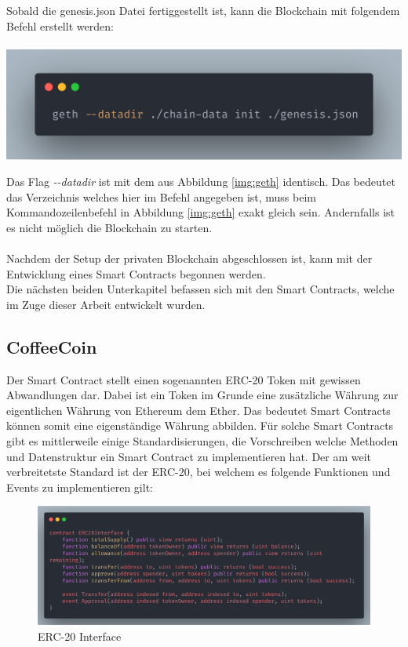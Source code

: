 Sobald die genesis.json Datei fertiggestellt ist, kann die Blockchain mit folgendem Befehl erstellt werden:\\\\
\includegraphics[width=.9\columnwidth]{./Abbildungen/Kapitel_03/geth-init.png}

Das Flag \textit{-{}-datadir} ist mit dem aus Abbildung \ref{img:geth} identisch. Das bedeutet das Verzeichnis welches hier im Befehl angegeben ist, muss beim Kommandozeilenbefehl in Abbildung \ref{img:geth} exakt gleich sein. Andernfalls ist es nicht möglich die Blockchain zu starten.\\\\
Nachdem der Setup der privaten Blockchain abgeschlossen ist, kann mit der Entwicklung eines Smart Contracts begonnen werden. \\
Die nächsten beiden Unterkapitel befassen sich mit den Smart Contracts, welche im Zuge dieser Arbeit entwickelt wurden.

\subsection{CoffeeCoin}
\label{subsec:cc}
Der Smart Contract  stellt einen sogenannten ERC-20 Token mit gewissen Abwandlungen dar. Dabei ist ein Token im Grunde eine zusätzliche Währung zur eigentlichen Währung von Ethereum dem Ether. Das bedeutet Smart Contracts können somit eine eigenständige Währung abbilden. Für solche Smart Contracts gibt es mittlerweile einige Standardisierungen, die Vorschreiben welche Methoden und Datenstruktur ein Smart Contract zu implementieren hat. Der am weit verbreitetste Standard ist der ERC-20, bei welchem es folgende Funktionen und Events zu implementieren gilt:

\begin{figure}[th!]
	\centering
	\includegraphics[width=.9\columnwidth]{./Abbildungen/Kapitel_03/erc20.png}
	\caption{ERC-20 Interface}
	\label{img:gen}
\end{figure}


